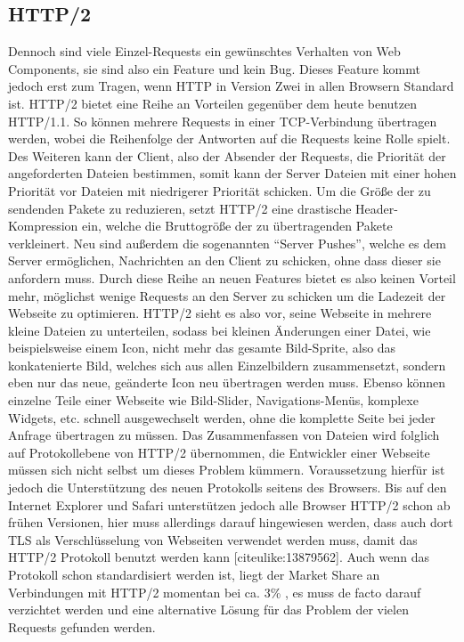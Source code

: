 \subsection{HTTP/2}\label{http2}

Dennoch sind viele Einzel-Requests ein gewünschtes Verhalten von Web Components, sie sind also ein Feature und kein Bug. Dieses Feature kommt jedoch erst zum Tragen, wenn HTTP in Version Zwei in allen Browsern Standard ist. HTTP/2 bietet eine Reihe an Vorteilen gegenüber dem heute benutzen HTTP/1.1. So können mehrere Requests in einer TCP-Verbindung übertragen werden, wobei die Reihenfolge der Antworten auf die Requests keine Rolle spielt. Des Weiteren kann der Client, also der Absender der Requests, die Priorität der angeforderten Dateien bestimmen, somit kann der Server Dateien mit einer hohen Priorität vor Dateien mit niedrigerer Priorität schicken. Um die Größe der zu sendenden Pakete zu reduzieren, setzt HTTP/2 eine drastische Header-Kompression ein, welche die Bruttogröße der zu übertragenden Pakete verkleinert. Neu sind außerdem die sogenannten ``Server Pushes'', welche es dem Server ermöglichen, Nachrichten an den Client zu schicken, ohne dass dieser sie anfordern muss.
Durch diese Reihe an neuen Features bietet es also keinen Vorteil mehr, möglichst wenige Requests an den Server zu schicken um die Ladezeit der Webseite zu optimieren. HTTP/2 sieht es also vor, seine Webseite in mehrere kleine Dateien zu unterteilen, sodass bei kleinen Änderungen einer Datei, wie beispielsweise einem Icon, nicht mehr das gesamte Bild-Sprite, also das konkatenierte Bild, welches sich aus allen Einzelbildern zusammensetzt, sondern eben nur das neue, geänderte Icon neu übertragen werden muss. Ebenso können einzelne Teile einer Webseite wie Bild-Slider, Navigations-Menüs, komplexe Widgets, etc. schnell ausgewechselt werden, ohne die komplette Seite bei jeder Anfrage übertragen zu müssen. Das Zusammenfassen von Dateien wird folglich auf Protokollebene von HTTP/2 übernommen, die Entwickler einer Webseite müssen sich nicht selbst um dieses Problem kümmern. Voraussetzung hierfür ist jedoch die Unterstützung des neuen Protokolls seitens des Browsers. Bis auf den Internet Explorer und Safari unterstützen jedoch alle Browser HTTP/2 schon ab frühen Versionen, hier muss allerdings darauf hingewiesen werden, dass auch dort TLS als Verschlüsselung von Webseiten verwendet werden muss, damit das HTTP/2 Protokoll benutzt werden kann [citeulike:13879562]. Auch wenn das Protokoll schon standardisiert werden ist, liegt der Market Share an Verbindungen mit HTTP/2 momentan bei ca. 3\% \cite{citeulike:13879575}, es muss de facto darauf verzichtet werden und eine alternative Lösung für das Problem der vielen Requests gefunden werden.



